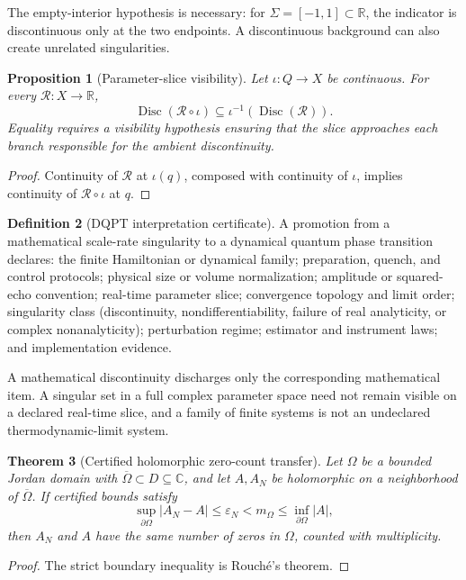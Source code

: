 \documentclass[11pt,a4paper]{article}
\theoremstyle{definition}
\newtheorem{definition}{Definition}[section]
\theoremstyle{plain}
\newtheorem{proposition}[definition]{Proposition}
\newtheorem{theorem}[definition]{Theorem}
\theoremstyle{remark}
\begin{document}
The empty-interior hypothesis is necessary: for
\(\Sigma=[-1,1]\subset\mathbb R\), the indicator is discontinuous only at the
two endpoints.  A discontinuous background can also create unrelated
singularities.

\begin{proposition}[Parameter-slice visibility]\label{prop:slicevisibility}
Let \(\iota:Q\to X\) be continuous.  For every
\(\mathcal R:X\to\mathbb R\),
\[
 \operatorname{Disc}(\mathcal R\circ\iota)
 \subseteq
 \iota^{-1}\!\left(\operatorname{Disc}(\mathcal R)\right).
\]
Equality requires a visibility hypothesis ensuring that the slice approaches
each branch responsible for the ambient discontinuity.
\end{proposition}
\begin{proof}
Continuity of \(\mathcal R\) at \(\iota(q)\), composed with continuity of
\(\iota\), implies continuity of \(\mathcal R\circ\iota\) at \(q\).
\end{proof}

\begin{definition}[DQPT interpretation certificate]\label{def:dqptcert}
A promotion from a mathematical scale-rate singularity to a dynamical quantum
phase transition declares: the finite Hamiltonian or dynamical family;
preparation, quench, and control protocols; physical size or volume
normalization; amplitude or squared-echo convention; real-time parameter
slice; convergence topology and limit order; singularity class
(discontinuity, nondifferentiability, failure of real analyticity, or complex
nonanalyticity); perturbation regime; estimator and instrument laws; and
implementation evidence.
\end{definition}

A mathematical discontinuity discharges only the corresponding mathematical
item.  A singular set in a full complex parameter space need not remain
visible on a declared real-time slice, and a family of finite systems is not
an undeclared thermodynamic-limit system.

\begin{theorem}[Certified holomorphic zero-count transfer]
\label{thm:analyticzerotransfer}
Let \(\Omega\) be a bounded Jordan domain with
\(\overline\Omega\subset D\subseteq\mathbb C\), and let \(A,A_N\) be
holomorphic on a neighborhood of \(\overline\Omega\).  If certified bounds
satisfy
\[
 \sup_{\partial\Omega}|A_N-A|
 \leq\varepsilon_N
 <m_\Omega
 \leq\inf_{\partial\Omega}|A|,
\]
then \(A_N\) and \(A\) have the same number of zeros in \(\Omega\), counted
with multiplicity.
\end{theorem}
\begin{proof}
The strict boundary inequality is Rouch\'e's theorem.
\end{proof}
\end{document}

